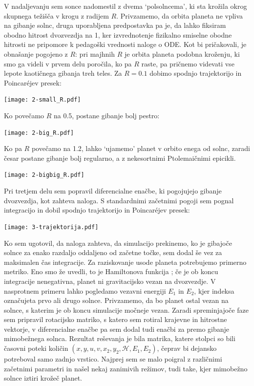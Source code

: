 V nadaljevanju sem sonce nadomestil z dvema `polsolncema', ki sta krožila okrog skupnega težišča v krogu z radijem $R$. Privzamemo, da orbita planeta ne vpliva na gibanje solnc, druga uporabljena predpostavka pa je, da lahko fiksiram obodno hitrost dvozvezdja na 1, ker izvrednotenje fizikalno smiselne obodne hitrosti ne pripomore k pedagoški vrednosti naloge o ODE. Kot bi pričakovali, je obnašanje pogojeno z $R$: pri majhnih $R$ je orbita planeta podobna kroženju, ki smo ga videli v prvem delu poročila, ko pa $R$ raste, pa pričnemo videvati vse lepote kaotičnega gibanja treh teles. Za $R=0.1$ dobimo spodnjo trajektorijo in Poincaréjev presek:
\begin{center}
     \texttt{[image: 2-small\_R.pdf]}
\end{center}
Ko povečamo $R$ na 0.5, postane gibanje bolj pestro:
\begin{center}
     \texttt{[image: 2-big\_R.pdf]}
\end{center}
Ko pa $R$ povečamo na 1.2, lahko `ujamemo' planet v orbito enega od solnc, zaradi česar postane gibanje bolj regularno, a z nekesortnimi Ptolemaičnimi epicikli.
\begin{center}
     \texttt{[image: 2-bigbig\_R.pdf]}
\end{center}

Pri tretjem delu sem popravil diferencialne enačbe, ki pogojujejo gibanje dvozvezdja, kot zahteva naloga. S standardnimi začetnimi pogoji sem pognal integracijo in dobil spodnjo trajektorijo in Poincaréjev presek:
\begin{center}
     \texttt{[image: 3-trajektorija.pdf]}
\end{center}
Ko sem ugotovil, da naloga zahteva, da simulacijo prekinemo, ko je gibajoče solnce za enako razdaljo oddaljeno od začetne točke, sem dodal še vez za maksimalen čas integracije. Za raziskovanje usode planeta potrebujemo primerno metriko. Eno smo že uvedli, to je Hamiltonova funkcija \HH{}; če je ob koncu integracije nenegativna, planet ni gravitacijsko vezan na dvozvezdje. V nasprotnem primeru lahko pogledamo vezavni energiji $E_{1}$ in $E_2$, kjer indeksa označujeta prvo ali drugo solnce. Privzamemo, da bo planet ostal vezan na solnce, s katerim je ob koncu simulacije močneje vezan. Zaradi spreminjajoče faze sem pripravil rotacijsko matriko, s katero sem rotiral krajevne in hitrostne vektorje, v diferencialne enačbe pa sem dodal tudi enačbi za premo gibanje mimobežnega solnca. Rezultat reševanja je bila matrika, katere stolpci so bili časovni poteki količin $\left( x,y,u,v,x_2,y_2,\mathcal{H}, E_1, E_2 \right)$, čeprav bi dejansko potreboval samo zadnjo vrstico. Najprej sem se malo poigral z različnimi začetnimi parametri in našel nekaj zanimivih režimov, tudi take, kjer mimobežno solnce iztiri krožeč planet.

